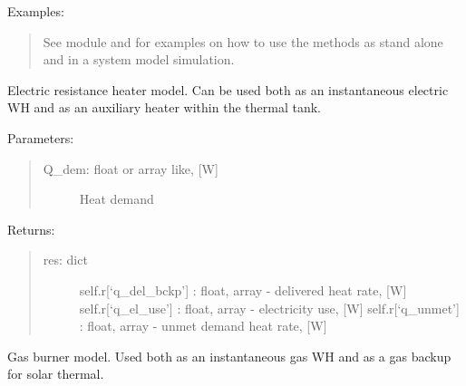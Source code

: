 \documentclass[letterpaper,10pt,english,openany]{sphinxmanual}
\begin{document}
\begin{fulllineitems}
Examples:
\begin{quote}

See  module and
for examples on how to use the methods as stand alone and
in a system model simulation.
\end{quote}

\begin{fulllineitems}
\label{\detokenize{source/mswh.system:mswh.system.components.Converter.electric_resistance}}
Electric resistance heater model. Can be
used both as an instantaneous electric WH and as
an auxiliary heater within the thermal tank.

Parameters:
\begin{quote}
\begin{description}
\item[{Q\_dem: float or array like, {[}W{]}}] \leavevmode
Heat demand

\end{description}
\end{quote}

Returns:
\begin{quote}
\begin{description}
\item[{res: dict}] \leavevmode
self.r{[}‘q\_del\_bckp’{]} : float, array - delivered heat rate, {[}W{]}
self.r{[}‘q\_el\_use’{]} : float, array - electricity use, {[}W{]}
self.r{[}‘q\_unmet’{]} : float, array - unmet demand heat rate, {[}W{]}

\end{description}
\end{quote}

\end{fulllineitems}


\begin{fulllineitems}
\label{\detokenize{source/mswh.system:mswh.system.components.Converter.gas_burner}}
Gas burner model. Used both
as an instantaneous gas WH and as a
gas backup for solar thermal.


\end{fulllineitems}
\end{fulllineitems}
\end{document}

